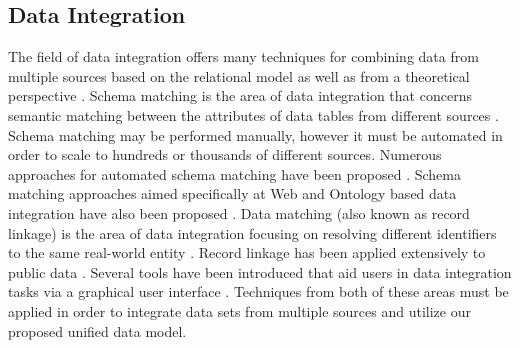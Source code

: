 \documentclass[12pt]{article}
\begin{document}
\begin{doublespace}
\subsection{Data Integration}
The field of data integration offers many techniques for combining data from multiple sources based on the relational model \cite{doan2012principles} as well as from a theoretical perspective \cite{lenzerini2002data} \cite{halevy2006data} \cite{ziegler2004three}. Schema matching is the area of data integration that concerns semantic matching between the attributes of data tables from different sources \cite{rahm2001survey} \cite{fagin2003data}. Schema matching may be performed manually, however it must be automated in order to scale to hundreds or thousands of different sources. Numerous approaches for automated schema matching have been proposed \cite{shvaiko2005survey} \cite{doan2001reconciling} \cite{kang2003schema} \cite{milo1998using} \cite{madhavan2001generic} \cite{doan2000learning}. Schema matching approaches aimed specifically at Web and Ontology based data integration have also been proposed \cite{he2003statistical} \cite{noy2004semantic} \cite{doan2005semantic} \cite{madhavan2007web} \cite{kalfoglou2003ontology} \cite{noy2009ontology} \cite{uschold2004ontologies} \cite{wache2001ontology} \cite{noy2003prompt} \cite{euzenat2007ontology}. Data matching (also known as record linkage) is the area of data integration focusing on resolving different identifiers to the same real-world entity \cite{winkler1999state} \cite{winkler2006overview} \cite{koudas2006record} \cite{aizawa2005fast} \cite{gu2003record}. Record linkage has been applied extensively to public data \cite{jaro1995probabilistic} \cite{jaro1989advances} \cite{holman1999population}. Several tools have been introduced that aid users in data integration tasks via a graphical user interface \cite{christen2008febrl} \cite{kandel2011wrangler} \cite{elfeky2002tailor}. Techniques from both of these areas must be applied in order to integrate data sets from multiple sources and utilize our proposed unified data model.


\end{doublespace}
\end{document}

